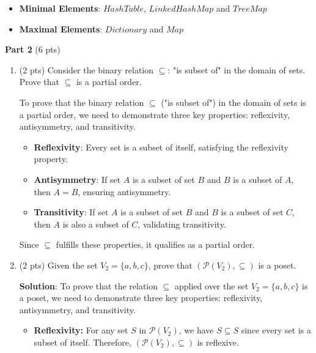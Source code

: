 \documentclass[12pt]{article}
\begin{document}
\begin{spacing}{1.5}
\begin{enumerate}
		      \begin{itemize}
		      	\item \textbf{Minimal Elements}: $HashTable$, $LinkedHashMap$ and $TreeMap$
		      	\item \textbf{Maximal Elements}: $Dictionary$ and $Map$
		      \end{itemize}
		      		      
	\end{enumerate}
		
	\noindent \textbf{Part 2} (6 pts)
		
	\begin{enumerate}
		\item (2 pts) Consider the binary relation $\subseteq$: "is subset of" in the domain of sets. Prove that $\subseteq$ is a partial order.
		      
		      To prove that the binary relation $\subseteq$ ("is subset of") in the domain of sets is a partial order, we need to demonstrate three key properties: reflexivity, antisymmetry, and transitivity.
		      
		      \begin{itemize}
		      	\item \textbf{Reflexivity}: Every set is a subset of itself, satisfying the reflexivity property.
		      	      
		      	\item \textbf{Antisymmetry}: If set $A$ is a subset of set $B$ and $B$ is a subset of $A$, then $A = B$, ensuring antisymmetry.
		      	      
		      	\item \textbf{Transitivity}: If set $A$ is a subset of set $B$ and $B$ is a subset of set $C$, then $A$ is also a subset of $C$, validating transitivity.
		      \end{itemize}
		      
		      Since $\subseteq$ fulfills these properties, it qualifies as a partial order.
		      
		\item (2 pts) Given the set $V_2=\{a,b,c\}$, prove that $(\mathcal{P}(V_2),\subseteq)$ is a poset.
		      
		      \textbf{Solution}: To prove that the relation $\subseteq$ applied over the set $V_2=\{a,b,c\}$ is a poset, we need to demonstrate three key properties: reflexivity, antisymmetry, and transitivity.
		              
		      \begin{itemize}
		      	\item \textbf{Reflexivity:}
		      	      For any set \( S \) in \( \mathcal{P}(V_2) \), we have \( S \subseteq S \) since every set is a subset of itself. Therefore, \( (\mathcal{P}(V_2),\subseteq) \) is reflexive.
		      	                  

\end{itemize}
\end{enumerate}
\end{spacing}
\end{document}
